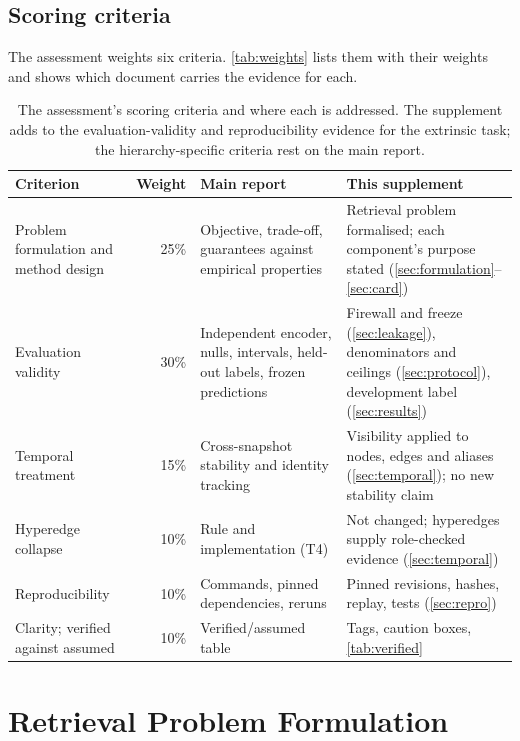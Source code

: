 \documentclass[11pt,a4paper]{article}
\newcommand{\cref}[1]{\autoref{#1}}
\newcommand{\Cref}[1]{\autoref{#1}}
\theoremstyle{remark}
\begin{document}
\subsection{Scoring criteria}

The assessment weights six criteria. \Cref{tab:weights} lists them with their weights and
shows which document carries the evidence for each.

\begin{table}[!htbp]
\centering
\caption[Scoring criteria and where they are addressed]{The assessment's scoring criteria and where each is addressed. The supplement
adds to the evaluation-validity and reproducibility evidence for the extrinsic task; the
hierarchy-specific criteria rest on the main report.}
\label{tab:weights}
\small
\begin{tabularx}{\linewidth}{p{3.9cm}rp{4.4cm}X}
\toprule
Criterion & Weight & Main report & This supplement\\
\midrule
Problem formulation and method design & 25\% & Objective, trade-off, guarantees against
  empirical properties & Retrieval problem formalised; each component's purpose stated
  (\cref{sec:formulation}--\cref{sec:card})\\
Evaluation validity & 30\% & Independent encoder, nulls, intervals, held-out labels,
  frozen predictions & Firewall and freeze (\cref{sec:leakage}), denominators and ceilings
  (\cref{sec:protocol}), development label (\cref{sec:results})\\
Temporal treatment & 15\% & Cross-snapshot stability and identity tracking & Visibility
  applied to nodes, edges and aliases (\cref{sec:temporal}); no new stability claim\\
Hyperedge collapse & 10\% & Rule and implementation (T4) & Not changed; hyperedges
  supply role-checked evidence (\cref{sec:temporal})\\
Reproducibility & 10\% & Commands, pinned dependencies, reruns & Pinned revisions, hashes,
  replay, tests (\cref{sec:repro})\\
Clarity; verified against assumed & 10\% & Verified/assumed table & Tags, caution boxes,
  \cref{tab:verified}\\
\bottomrule
\end{tabularx}
\end{table}

\section{Retrieval Problem Formulation}
\label{sec:formulation}
\end{document}
